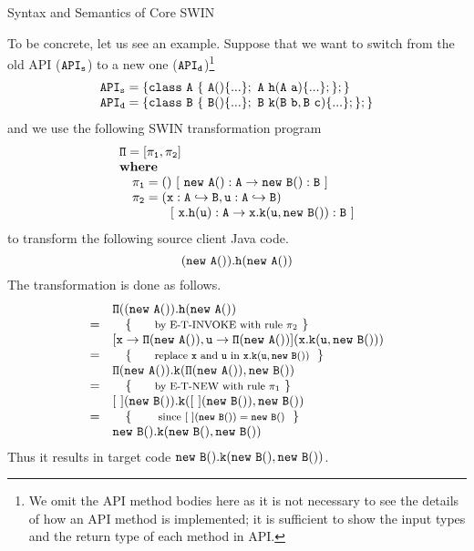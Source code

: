 \begin{section}{Syntax and Semantics of Core SWIN}
\begin{enumerate}
  
\end{enumerate}

%

To be concrete, let us see an example. Suppose that we want to switch from 
the old API ($\tt API_s$) to a new one ($\tt API_d$)\footnote{
We omit the API method bodies here as it is not necessary
to see the details of how an API method is implemented;
it is sufficient to show the input types and the return type of each method in API.}
\[
\begin{array}{lll}
\mbox{$\tt API_s=\{class\ A\ \{\ A()\{...\};\ A\ h(A\ a)\{...\};\};\}$}\\
\mbox{$\tt API_d=\{class\ B\ \{\ B()\{...\};\ B\ k(B\ b,B\ c)\{...\};\};\}$}
\end{array}
\]
and we use the following SWIN transformation program
\[
\begin{array}{lll}
\mbox{$\tt\Pi=[\pi_1,\pi_2]$}\\
{\bf where}\\
\quad \mbox{$\tt\pi_1=()\ [\ new\ A() : A \rightarrow new\ B() : B\ ]$}\\
\quad \mbox{$\tt\pi_2=(x:A\hookrightarrow B, u:A\hookrightarrow B)$} \\
\qquad\qquad \mbox{$\tt[\ x.h(u) : A \rightarrow x.k(u,new\ B()) : B\ ]$}
\end{array}
\]
to transform the following source client Java code.
\[
\mbox{$\tt(new\ A()).h(new\ A())$}
\]
The transformation is done as follows.
\[
\begin{array}{llll}
   & \mbox{$\tt \Pi((new\ A()).h(new\ A())$}\\
=  & \reason{by E-T-INVOKE with rule $\pi_2$}\\
   & \mbox{$\tt [x\rightarrow \Pi(new\ A()), u\rightarrow \Pi(new\ A())](x.k(u,new\ B()) )$}\\
=  & \reason{replace $\tt x$ and $\tt u$ in $\tt x.k(u,new\ B())$ }\\
   & \mbox{$\tt \Pi(new\ A()).k( \Pi(new\ A()),new\ B())$}\\
=  & \reason{by E-T-NEW with rule $\pi_1$}\\
   & \mbox{$\tt [~](new\ B()).k( [~](new\ B()),new\ B())$}\\
=  & \reason{ since $\tt [~](new\ B()) = new\ B()$ }\\
   & \mbox{$\tt new\ B().k(new\ B(),new\ B())$}\\
\end{array}
\]
Thus it results in target code $\tt new\ B().k(new\ B(),new\ B())$.


\end{section}
